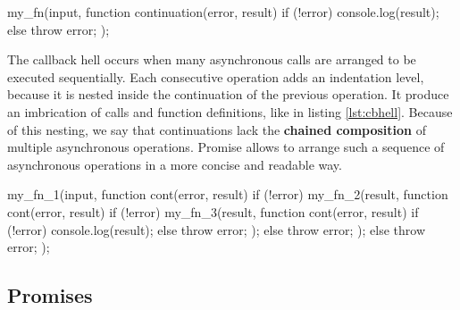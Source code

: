 \begin{code}[js, %
             caption={Example of a continuation}, %
             label={lst:continuation}] %
my_fn(input, function continuation(error, result) {
  if (!error) {
    console.log(result);
  } else {
    throw error;
  }
});
\end{code}

The callback hell occurs when many asynchronous calls are arranged to be executed sequentially.
Each consecutive operation adds an indentation level, because it is nested inside the continuation of the previous operation.
It produce an imbrication of calls and function definitions, like in listing \ref{lst:cbhell}.
Because of this nesting, we say that continuations lack the \textbf{chained composition} of multiple asynchronous operations.
Promise allows to arrange such a sequence of asynchronous operations in a more concise and readable way.


\begin{code}[js, %
             caption={Example of a sequence of continuations}, %
             label={lst:cbhell}] %
my_fn_1(input, function cont(error, result) {
  if (!error) {
    my_fn_2(result, function cont(error, result) {
      if (!error) {
        my_fn_3(result, function cont(error, result) {
          if (!error) {
            console.log(result);
          } else {
            throw error;
          }
        });
      } else {
        throw error;
      }
    });
  } else {
    throw error;
  }
});
\end{code}

\subsection{Promises} \label{section:definitions:promise}


